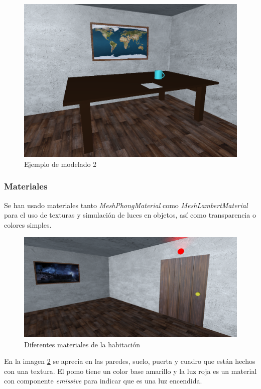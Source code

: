 \begin{figure}[H]
  \centering
  \includegraphics[scale=0.25]{mesa}
  \caption{Ejemplo de modelado 2}
  \label{fig:mesa}
\end{figure}

\subsubsection{Materiales}
Se han usado materiales tanto \textit{MeshPhongMaterial} como \textit{MeshLambertMaterial} para el uso de texturas y simulación de luces en objetos, así como transparencia o colores simples.

\begin{figure}[H]
  \centering
  \includegraphics[scale=0.2]{habitacion}
  \caption{Diferentes materiales de la habitación}
  \label{fig:materiales}
\end{figure}

En la imagen \ref{fig:materiales} se aprecia en las paredes, suelo, puerta y cuadro que están hechos con una textura. El pomo tiene un color base amarillo y la luz roja es un material con componente \textit{emissive} para indicar que es una luz encendida.
